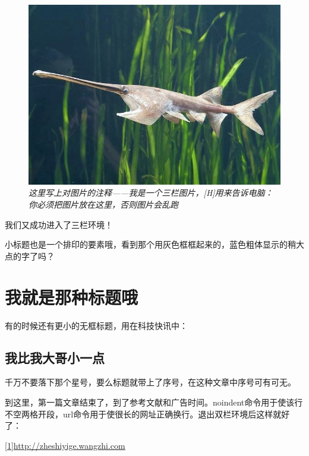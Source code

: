 \begin{figure}[H]
    \centering
    \includegraphics[width=0.6\linewidth]{IMG/202001/cjbx.jpg}
    \caption{\textit{这里写上对图片的注释——我是一个三栏图片，[H]用来告诉电脑：你必须把图片放在这里，否则图片会乱跑}}
\end{figure}
    
\begin{multicols}{3}
    我们又成功进入了三栏环境！
    
    小标题也是一个排印的要素哦，看到那个用灰色框框起来的，蓝色粗体显示的稍大点的字了吗？
    \section*{我就是那种标题哦}
    有的时候还有更小的无框标题，用在科技快讯中：
    \subsection*{我比我大哥小一点}
    千万不要落下那个星号，要么标题就带上了序号，在这种文章中序号可有可无。
    
    到这里，第一篇文章结束了，到了参考文献和广告时间。noindent命令用于使该行不空两格开段，url命令用于使很长的网址正确换行。退出双栏环境后这样就好了：
\end{multicols}

\noindent{}

\noindent\url{[1]http://zheshiyige.wangzhi.com}

\ADyixuehui

\newpage


